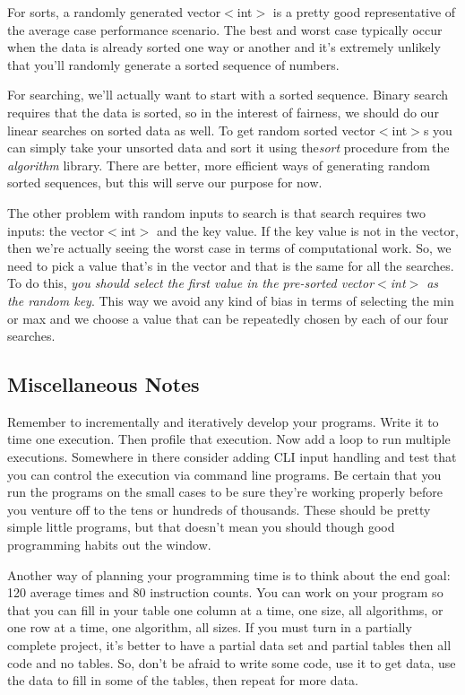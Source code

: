 \documentclass[]{tufte-handout}
\begin{document}
For sorts, a randomly generated vector$<$int$>$ is a pretty good representative of the average case performance scenario. The best and worst case typically occur when the data is already sorted one way or another and it's extremely unlikely that you'll randomly generate a sorted sequence of numbers. 

For searching, we'll actually want to start with a sorted sequence. Binary search requires that the data is sorted, so in the interest of fairness, we should do our linear searches on sorted data as well. To get random sorted vector$<$int$>$s you can simply take your unsorted data and sort it using the\textit{sort} procedure from the \textit{algorithm} library.  There are better, more efficient ways of generating random sorted sequences, but this will serve our purpose for now. 

The other problem with random inputs to search is that search requires two inputs: the vector$<$int$>$ and the key value.  If the key value is not in the vector, then we're actually seeing the worst case in terms of computational work. So, we need to pick a value that's in the vector and that is the same for all the searches. To do this, \textit{you should select the first value in the pre-sorted vector$<$int$>$ as the random key}. This way we avoid any kind of bias in terms of selecting the min or max and we choose a value that can be repeatedly chosen by each of our four searches. 

\subsection{Miscellaneous Notes}

Remember to incrementally and iteratively develop your programs. Write it to time one execution. Then profile that execution. Now add a loop to run multiple executions. Somewhere in there consider adding CLI input handling and test that you can control the execution via command line programs. Be certain that you run the programs on the small cases to be sure they're working properly before you venture off to the tens or hundreds of thousands. These should be pretty simple little programs, but that doesn't mean you should though good programming habits out the window. 

Another way of planning your programming time is to think about the end goal: 120 average times and 80 instruction counts. You can work on your program so that you can fill in your table one column at a time, one size, all algorithms, or one row at a time, one algorithm, all sizes.  If you must turn in a partially complete project, it's better to have a partial data set and partial tables then all code and no tables. So, don't be afraid to write some code, use it to get data, use the data to fill in some of the tables, then repeat for more data.
\end{document}
